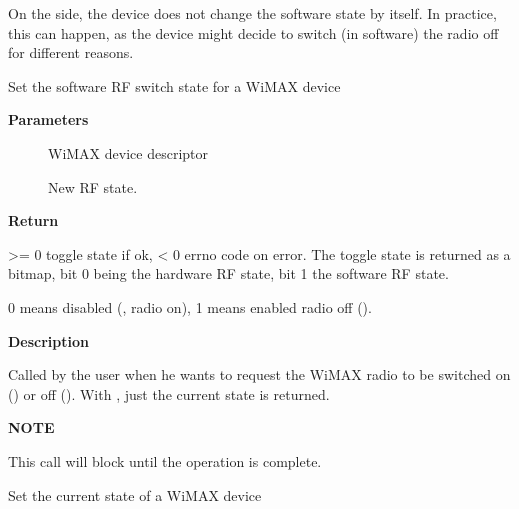 \documentclass[a4paper,8pt,english]{sphinxmanual}
\begin{document}
On the side, the device does not change the software state by
itself. In practice, this can happen, as the device might decide to
switch (in software) the radio off for different reasons.

\begin{fulllineitems}
\label{networking/kapi:c.wimax_rfkill}
Set the software RF switch state for a WiMAX device

\end{fulllineitems}


\textbf{Parameters}
\begin{description}
\item[{}] \leavevmode
WiMAX device descriptor

\item[{}] \leavevmode
New RF state.

\end{description}

\textbf{Return}

\textgreater{}= 0 toggle state if ok, \textless{} 0 errno code on error. The toggle state
is returned as a bitmap, bit 0 being the hardware RF state, bit 1
the software RF state.

0 means disabled (, radio on), 1 means enabled radio
off ().

\textbf{Description}

Called by the user when he wants to request the WiMAX radio to be
switched on () or off (). With
, just the current state is returned.

\textbf{NOTE}

This call will block until the operation is complete.

\begin{fulllineitems}
\label{networking/kapi:c.wimax_state_change}
Set the current state of a WiMAX device

\end{fulllineitems}
\end{document}
